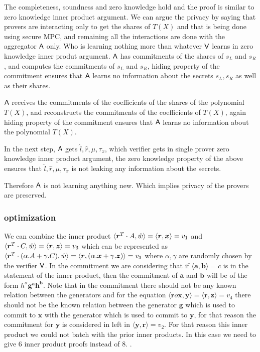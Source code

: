 The completeness, soundness and zero knowledge hold and the proof is similar to zero knowledge inner product argument.
We can argue the privacy by saying that provers are interacting only to get the shares of $T(X)$ and that is being done using secure MPC, and remaining all the interactions are done with the aggregator $\mathsf{A}$ only. Who is learning nothing more than whatever $\mathsf{V}$ learns in zero knowledge inner produt argument. 
$\mathsf{A}$ has commitments of the shares of $s_L$ and $s_R$, and computes the commitments of $s_L$ and $s_R$, hiding property of the commitment ensures that $\mathsf{A}$ learns no information about the secrets $s_L, s_R$ as well as their shares.

$\mathsf{A}$ receives the commitments of the coefficients of the shares of the polynomial $T(X)$, and reconstructs the commitments of the coefficients of $T(X)$, again hiding property of the commitment ensures that $\mathsf{A}$ learns no information about the polynomial $T(X)$.

In the next step, $\mathsf{A}$ gets $\hat{l}, \hat{r}, \mu, \tau_x$, which verifier gets in single prover zero knowledge inner product argument, the zero knowledge property of the above ensures that $\hat{l}, \hat{r}, \mu, \tau_x$ is not leaking any information about the secrets.

Therefore $\mathsf{A}$ is not learning anything new. Which implies privacy of the provers are preserved.

\subsubsection{optimization}
We can combine the inner product $\langle \bm{r}^T \cdot A, \hat{w} \rangle = \langle \bm{r}, \bm{x} \rangle = v_1$ and $\langle \bm{r}^T \cdot C, \hat{w} \rangle = \langle \bm{r}, \bm{z} \rangle = v_3$ which can be represented as $\langle \bm{r}^T \cdot(\alpha.A+\gamma.C), \hat{w} \rangle = \langle \bm{r}, (\alpha.\bm{x}+\gamma.\bm{z}) \rangle = v_3$ where $\alpha, \gamma$ are randomly chosen by the verifier $\mathsf{V}$. In the commitment we are considering that if $\langle \bm{a},\bm{b}\rangle= c$ is in the statement of the inner product, then the commitment of $\bm{a}$ and $\bm{b}$ will be of the form $h^{\sigma} \bm{g}^{\bm{a}} \bm{h}^{\bm{b}}$. Note that in the commitment there should not be any known relation between the generators and for the equation $\langle \bm{r} o \bm{x}, \bm{y} \rangle = \langle \bm{r}, \bm{z} \rangle = v_4$ there should not be the known relation between the generator $\bm{g}$ which is used to commit to $\bm{x}$ with the generator which is used to commit to $\bm{y}$, for that reason the commitment for $\bm{y}$ is considered in left in $\langle \bm{y}, \bm{r} \rangle = v_2$. For that reason this inner product we could not batch with the prior inner products. In this case we need to give 6 inner product proofs instead of 8. 
.

